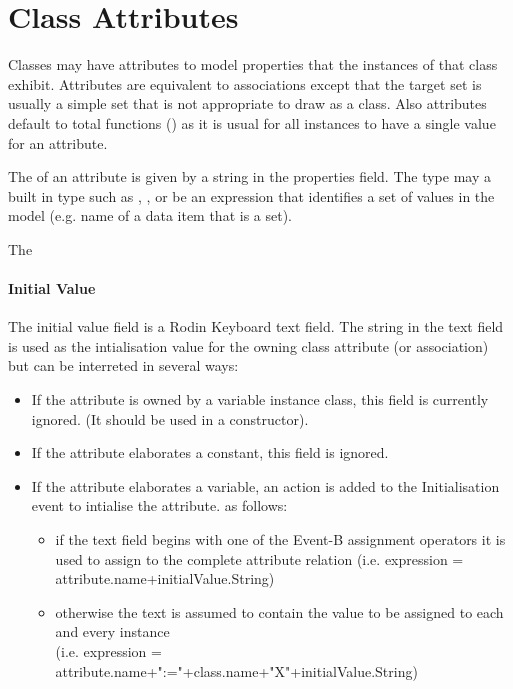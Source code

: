 \section{Class Attributes}
\label{sec:classdiagrams-attributes}

Classes may have attributes to model properties that the instances of that class exhibit.
Attributes are equivalent to associations except that the target set is usually a simple set that is not appropriate to draw as a class.
Also attributes default to total functions () as it is usual for all instances to have a single value for an attribute.

The  of an attribute is given by a string in the properties field.
The type may a built in type such as , ,  or be an expression that identifies a set of values in the model (e.g. name of a data item that is a set).
 
The 

\paragraph{Initial Value } 
The initial value field is a Rodin Keyboard text field. 
The string in the text field is used as the intialisation value for the owning class attribute (or association) but can be interreted in several ways:
\begin{itemize}
	\item If the attribute is owned by a variable instance class, this field is currently ignored. (It should be used in a constructor).
	\item If the attribute elaborates a constant, this field is ignored. 
	\item If the attribute elaborates a variable, an action is added to the Initialisation event to intialise the attribute. as follows:
	\begin{itemize}
		\item if the text field begins with one of the Event-B assignment operators it is used to assign to the complete attribute relation (i.e. expression = attribute.name+initialValue.String)
		\item otherwise the text is assumed to contain the value to be assigned to each and every instance \\(i.e. expression = attribute.name+":="+class.name+"X"+initialValue.String)
	\end{itemize}	
\end{itemize}

